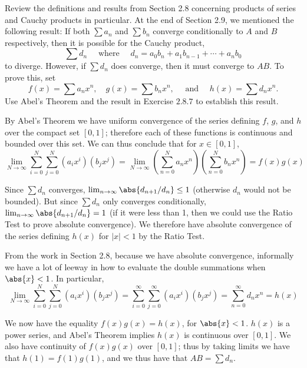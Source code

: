 \begin{exercise}
Review the definitions and results from Section 2.8 concerning products of series and Cauchy products in particular. At the end of Section 2.9, we mentioned the following result: If both $\sum a_{n}$ and $\sum b_{n}$ converge conditionally to $A$ and $B$ respectively, then it is possible for the Cauchy product,
$$
\sum d_{n} \quad \text { where } \quad d_{n}=a_{0} b_{n}+a_{1} b_{n-1}+\cdots+a_{n} b_{0}
$$
to diverge. However, if $\sum d_{n}$ does converge, then it must converge to $A B$. To prove this, set
$$
f(x)=\sum a_{n} x^{n}, \quad g(x)=\sum b_{n} x^{n}, \quad \text { and } \quad h(x)=\sum d_{n} x^{n} .
$$
Use Abel's Theorem and the result in Exercise $2.8.7$ to establish this result.
\end{exercise}

\begin{solution}
By Abel's Theorem we have uniform convergence of the series defining \(f\), \(g\), and \(h\) over the compact set \([0,1]\); therefore each of these functions is continuous and bounded over this set. We can thus conclude that for \(x \in [0,1]\),
\[\lim_{N \to \infty} \sum^N_{i=0} \sum^N_{j=0} \left(a_i x^i\right) \left(b_j x^j\right) = \lim_{N \to \infty} \left(\sum^N_{n=0} a_n x^n\right) \left(\sum^N_{n=0} b_n x^n\right) = f(x) g(x)\]

Since \(\sum d_n\) converges, \(\lim_{n \to \infty} \abs{d_{n+1}/d_n} \leq 1\)  (otherwise \(d_n\) would not be bounded). But since \(\sum d_n\) only converges conditionally, \(\lim_{n \to \infty} \abs{d_{n+1}/d_n} = 1\) (if it were less than 1, then we could use the Ratio Test to prove absolute convergence). We therefore have absolute convergence of the series defining \(h(x)\) for \(|x| < 1\) by the Ratio Test.

From the work in Section 2.8, because we have absolute convergence, informally we have a lot of leeway in how to evaluate the double summations when \(\abs{x} < 1\). In particular,
\[\lim_{N \to \infty} \sum^N_{i=0} \sum^N_{j=0} \left(a_i x^i\right) \left(b_j x^j\right) = \sum^\infty_{i=0} \sum^\infty_{j=0} \left(a_i x^i\right) \left(b_j x^j\right) = \sum^\infty_{n=0} d_n x^n = h(x)\]

We now have the equality \(f(x)g(x) = h(x)\), for \(\abs{x} < 1\). \(h(x)\) is a power series, and Abel's Theorem implies \(h(x)\) is continuous over \([0, 1]\). We also have continuity of \(f(x)g(x)\) over \([0,1]\); thus by taking limits we have that \(h(1) = f(1)g(1)\), and we thus have that \(AB =\sum d_n\).
\end{solution}


